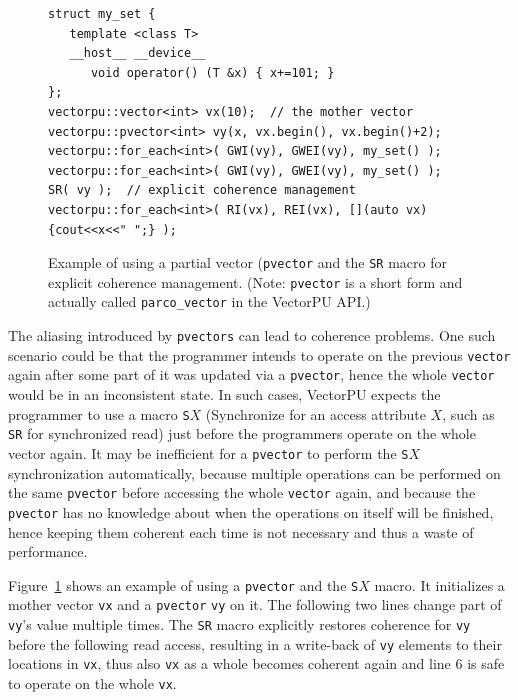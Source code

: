 \begin{figure}
\noindent 
\begin{minipage}{\linewidth}
\begin{small}
\begin{verbatim}
struct my_set {
   template <class T>
   __host__ __device__
      void operator() (T &x) { x+=101; } 
};
vectorpu::vector<int> vx(10);  // the mother vector
vectorpu::pvector<int> vy(x, vx.begin(), vx.begin()+2);
vectorpu::for_each<int>( GWI(vy), GWEI(vy), my_set() );
vectorpu::for_each<int>( GWI(vy), GWEI(vy), my_set() );
SR( vy );  // explicit coherence management
vectorpu::for_each<int>( RI(vx), REI(vx), [](auto vx) {cout<<x<<" ";} );  
\end{verbatim}
\end{small}
\end{minipage}
\caption{\label{fig:pvector}Example of using a partial vector (\texttt{pvector} and the \texttt{SR} macro for explicit coherence management. (Note: \texttt{pvector} is a short form and actually called \texttt{parco\_vector} in the VectorPU API.)}
\end{figure}

The aliasing introduced by \texttt{pvectors} can lead to coherence problems. One such scenario could be that the
programmer intends to operate on the previous \texttt{vector} again after
some part of it was updated via a \texttt{pvector}, 
hence the whole \texttt{vector} would be in an inconsistent state.
In such cases, VectorPU expects the programmer to use a macro \texttt{S$X$} (Synchronize for an access attribute $X$,
such as \verb.SR. for synchronized read)
just before the programmers operate on the whole vector again.
It may be inefficient for a \texttt{pvector} to perform the \texttt{S$X$} synchronization
automatically, because multiple operations can be performed on the same \texttt{pvector} 
before accessing the whole \texttt{vector} again, 
and because the \texttt{pvector}
has no knowledge about when the operations on itself will be finished, hence
keeping them coherent each time is not necessary and thus a waste of performance.

Figure~\ref{fig:pvector}
shows an example of using a \texttt{pvector} and the 
\texttt{S$X$} macro.
It initializes a mother vector \texttt{vx}
and a \texttt{pvector} \texttt{vy} on it.
The following two lines change part of \texttt{vy}'s value multiple times. %
The \texttt{SR} macro explicitly restores coherence for
\texttt{vy} before the following read access, 
resulting in a write-back of \texttt{vy} elements
to their locations in \texttt{vx},
thus also \texttt{vx} as a whole becomes coherent again
and line 6 is safe to operate on the whole \texttt{vx}.


